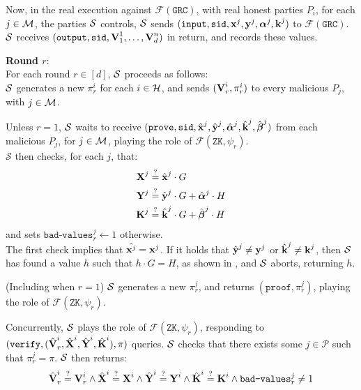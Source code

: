 Now, in the real execution against $\mathcal{F}(\texttt{GRC})$,
with real honest parties $P_i$, for
each $j \in \mathcal{M}$, the parties $\mathcal{S}$ controls, $\mathcal{S}$ sends
$(\texttt{input}, \texttt{sid}, \textbf{x}^j, \textbf{y}^j, \boldsymbol{\alpha}^j, \textbf{k}^j)$ to $\mathcal{F}(\texttt{GRC})$.\\
$\mathcal{S}$ receives $(\texttt{output}, \texttt{sid}, \textbf{V}^1_1, \ldots, \textbf{V}^n_d)$ in return,
and records these values.

\textbf{Round $r$}:\\
For each round $r \in [d]$, $\mathcal{S}$ proceeds as follows:\\
$\mathcal{S}$ generates a new $\pi^i_r$ for each $i \in \mathcal{H}$, and sends
$(\textbf{V}^i_r, \pi^i_r)$ to every malicious $P_j$, with $j \in \mathcal{M}$.

Unless $r = 1$, $\mathcal{S}$ waits to receive 
$(\texttt{prove}, \texttt{sid}, \hat{\textbf{x}}^j, \hat{\textbf{y}}^j, \hat{\boldsymbol{\alpha}}^j, \hat{\textbf{k}}^j, \hat{\boldsymbol{\beta}}^j)$
from each malicious $P_j$, for $j \in \mathcal{M}$, playing the role of $\mathcal{F}(\texttt{ZK}, \psi_r)$.\\
$\mathcal{S}$ then checks, for each $j$, that:
$$
\begin{aligned}
\textbf{X}^j &\stackrel{?}{=} \hat{\textbf{x}}^j \cdot G\\
\textbf{Y}^j &\stackrel{?}{=} \hat{\textbf{y}}^j \cdot G + \hat{\boldsymbol{\alpha}}^j \cdot H\\
\textbf{K}^j &\stackrel{?}{=} \hat{\textbf{k}}^j \cdot G + \hat{\boldsymbol{\beta}}^j \cdot H
\end{aligned}
$$
and sets $\texttt{bad-values}^j_r \gets 1$ otherwise.\\
The first check implies that $\hat{\textbf{x}^j} = \textbf{x}^j$. If it holds that
$\hat{\textbf{y}}^j \neq \textbf{y}^j$ or $\hat{\textbf{k}}^j \neq \textbf{k}^j$, then $\mathcal{S}$ has
found a value $h$ such that $h \cdot G = H$, as shown in ,
and $\mathcal{S}$ aborts, returning $h$.

(Including when $r = 1$) $\mathcal{S}$ generates a new $\pi^j_r$, and returns $(\texttt{proof}, \pi^j_r)$,
playing the role of $\mathcal{F}(\texttt{ZK}, \psi_r)$.

Concurrently, $\mathcal{S}$ plays the role of $\mathcal{F}(\texttt{ZK}, \psi_r)$,
responding to $(\texttt{verify}, (\hat{\textbf{V}}^i_r, \hat{\textbf{X}}^i, \hat{\textbf{Y}}^i, \hat{\textbf{K}}^i), \pi)$
queries. $\mathcal{S}$ checks that there exists some $j \in \mathcal{P}$ such that
$\pi^j_r = \pi$. $\mathcal{S}$ then returns:
$$
\hat{\textbf{V}}^i_r \stackrel{?}{=} \textbf{V}^i_r \land
\hat{\textbf{X}}^i \stackrel{?}{=} \textbf{X}^i \land
\hat{\textbf{Y}}^i \stackrel{?}{=} \textbf{Y}^i \land
\hat{\textbf{K}}^i \stackrel{?}{=} \textbf{K}^i \land
\texttt{bad-values}^j_r \neq 1
$$

